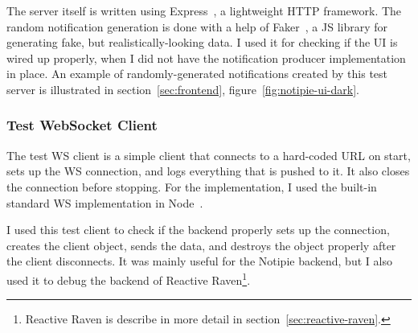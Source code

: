 The server itself is written
using Express~\cite{holowaychuck_express_2022},
a lightweight \ac{HTTP} framework.
The random notification generation
is done with a help of Faker~\cite{marak_faker_2022},
a \ac{JS} library for generating fake,
but realistically-looking data.
I used it for checking if the \ac{UI}
is wired up properly,
when I did not have
the notification producer
implementation in place.
An example of randomly-generated notifications
created by this test server is illustrated
in section~\ref{sec:frontend},
figure~\ref{fig:notipie-ui-dark}.

\subsubsection{Test WebSocket Client}\label{sec:test-ws-client}

The test \ac{WS} client
is a simple client that connects
to a hard-coded \ac{URL} on start,
sets up the \ac{WS} connection,
and logs everything that is pushed to it.
It also closes the connection before stopping.
For the implementation,
I used the built-in standard \ac{WS} implementation
in Node~\cite{trott_node_2022}.

I used this test client
to check if the backend properly
sets up the connection,
creates the client object,
sends the data,
and destroys the object properly
after the client disconnects.
It was mainly useful for the Notipie backend,
but I also used it to debug the backend
of Reactive Raven\footnote{
  Reactive Raven is describe in more detail in section~\ref{sec:reactive-raven}.
}.
